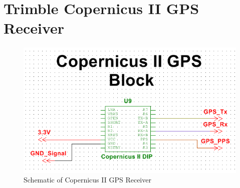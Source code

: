 \section{Trimble Copernicus II GPS Receiver}
\begin{figure}[H]
\centering
\includegraphics[width=\textwidth,height=\textheight,keepaspectratio]{./KIRBY_Images/Multisim_GPS}
\caption{Schematic of Copernicus II GPS Receiver}
\label{fig:Schematic_Copernicus}
\end{figure}